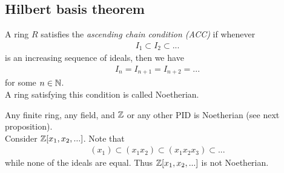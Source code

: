 \documentclass[a4paper]{article}
\begin{document}
\subsection{Hilbert basis theorem}
A ring $R$ satisfies the \emph{ascending chain condition (ACC)} if whenever
\begin{equation*}
\begin{aligned}
I_1 \subset I_2 \subset ...
\end{aligned}
\end{equation*}
is an increasing sequence of ideals, then we have 
\begin{equation*}
\begin{aligned}
I_n = I_{n+1} = I_{n+2} = ...
\end{aligned}
\end{equation*}
for some $n \in \mathbb{N}$.\\
A ring satisfying this condition is called Noetherian.

\begin{eg}
Any finite ring, any field, and $\mathbb{Z}$ or any other PID is Noetherian (see next proposition).\\
Consider $\mathbb{Z}[x_1,x_2,...]$. Note that 
\begin{equation*}
\begin{aligned}
\left(x_1\right) \subset \left(x_1x_2\right) \subset \left(x_1x_2x_3\right) \subset ...
\end{aligned}
\end{equation*}
while none of the ideals are equal. Thus $\mathbb{Z}[x_1,x_2,...]$ is not Noetherian.
\end{eg}
\end{document}
